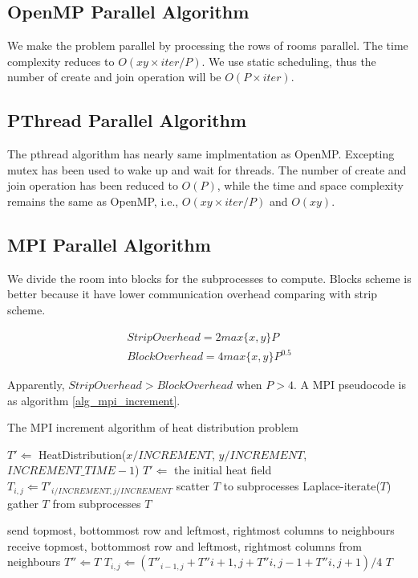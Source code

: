 \documentclass{acm_proc_article-sp}
\begin{document}
\subsection{OpenMP Parallel Algorithm}

We make the problem parallel by processing the rows of rooms parallel. The time complexity reduces to $O(xy\times iter/P)$. We use static scheduling, thus the number of create and join operation will be $O(P\times iter)$.

\subsection{PThread Parallel Algorithm}

The pthread algorithm has nearly same implmentation as OpenMP. Excepting mutex has been used to wake up and wait for threads. The number of create and join operation has been reduced to $O(P)$, while the time and space complexity remains the same as OpenMP, i.e., $O(xy\times iter/P)$ and $O(xy)$.

\subsection{MPI Parallel Algorithm}

We divide the room into blocks for the subprocesses to compute. Blocks scheme is better because it have lower communication overhead comparing with strip scheme.

\begin{align}
	StripOverhead = 2max\{x,y\}P\\
	BlockOverhead = 4max\{x,y\}P^{0.5}
\end{align}

Apparently, $StripOverhead > BlockOverhead$ when $P>4$. A MPI pseudocode is as algorithm \ref{alg_mpi_increment}.

\begin{algorithm}                     
\caption{The MPI increment algorithm of heat distribution problem}        
\label{alg_mpi_increment}                         
\begin{algorithmic}
			\State $T' \Leftarrow$ HeatDistribution($x/INCREMENT$, $y/INCREMENT$, $INCREMENT\_TIME-1$)
		\Else
			\State $T' \Leftarrow$ the initial heat field
		\EndIf
				\State $T_{i,j} \Leftarrow T'_{i/INCREMENT, j/INCREMENT}$
			\EndFor
		\EndFor
		\State scatter $T$ to subprocesses
			\State Laplace-iterate($T$)
		\EndWhile
		\State gather $T$ from subprocesses
		\Return $T$
    \EndFunction
    
		\State send topmost, bottommost row and leftmost, rightmost columns to neighbours
		\State receive topmost, bottommost row and leftmost, rightmost columns from neighbours
		\State $T'' \Leftarrow T$
				\State $T_{i,j} \Leftarrow (T''_{i-1,j}+T''{i+1,j}+T''{i,j-1}+T''{i,j+1})/4$
			\EndFor
		\EndFor	
		\Return $T$
    \EndFunction
\end{algorithmic}
\end{algorithm}
\end{document}
